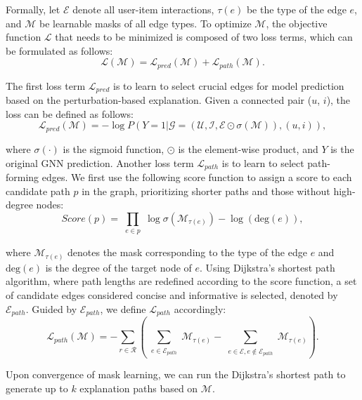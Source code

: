  Formally, let $\mathcal{E}$ denote all user-item interactions, $\tau(e)$ be the type of the edge $e$, and $\mathcal{M}$ be learnable masks of all edge types. To optimize $\mathcal{M}$, the objective function \( \mathcal{L} \) that needs to be minimized is composed of two loss terms, which can be formulated as follows:
\begin{equation}
    \mathcal{L}(\mathcal{M}) = \mathcal{L}_{pred}(\mathcal{M}) + \mathcal{L}_{path}(\mathcal{M}).
\end{equation}

\noindent The first loss term $\mathcal{L}_{pred}$ is to learn to select crucial edges for model prediction based on the perturbation-based explanation. Given a connected pair ($u$, $i$), the loss can be defined as follows: 
\begin{equation}
    \mathcal{L}_{pred}(\mathcal{M}) = - \log P (Y = 1 | \mathcal{G}= (\mathcal{U}, \mathcal{I}, \mathcal{E} \odot \sigma(\mathcal{M})), (u, i)),
\end{equation}

\noindent where $\sigma(\cdot)$ is the sigmoid function, $\odot$ is the element-wise product, and $Y$ is the original GNN prediction. Another loss term $\mathcal{L}_{path}$ is to learn to select path-forming edges. We first use the following score function to assign a score to each candidate path $p$ in the graph, prioritizing shorter paths and those without high-degree nodes:
\begin{equation}
    Score(p) = \prod_{\substack{e \in p}} \log \sigma (\mathcal{M}_{\tau(e)}) - \log(\text{deg}(e)),
\end{equation}

\noindent where $\mathcal{M}_{\tau(e)}$ denotes the mask corresponding to the type of the edge $e$ and $\text{deg}(e)$ is the degree of the target node of $e$. Using Dijkstra's shortest path algorithm, where path lengths are redefined according to the score function, a set of candidate edges considered concise and informative is selected, denoted by $\mathcal{E}_{path}$. Guided by $\mathcal{E}_{path}$, we define $\mathcal{L}_{path}$ accordingly:
\begin{equation}
    \mathcal{L}_{path}(\mathcal{M}) = - \sum_{r \in \mathcal{R}} (\sum_{\substack{e \in \mathcal{E}_{path}}} \mathcal{M}_{\tau(e)} - \sum_{\substack{e \in \mathcal{E}, e \notin \mathcal{E}_{path}}}  \mathcal{M}_{\tau(e)}).
\end{equation}

\noindent Upon convergence of mask learning, we can run the Dijkstra's shortest path to generate up to $k$ explanation paths based on $\mathcal{M}$. 

